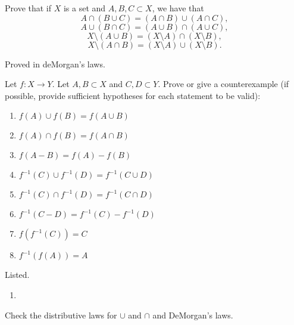   \begin{exercise}
    Prove that if $X$ is a set and $A,B,C \subset X$, we have that
    \begin{equation}
      A \cap (B \cup C) = (A \cap B) \cup (A \cap C),
    \end{equation}
    \begin{equation}
      A \cup (B \cap C) = (A \cup B) \cap (A \cup C),
    \end{equation}
    \begin{equation}
      X \setminus (A \cup B) = (X \setminus A) \cap (X \setminus B),
    \end{equation}
    \begin{equation}
      X \setminus (A \cap B) = (X \setminus A) \cup (X \setminus B).
    \end{equation}
  \end{exercise}
  \begin{solution}
    Proved in deMorgan's laws. 
  \end{solution}

  \begin{exercise}
    Let $f: X \to Y$. Let $A,B \subset X$ and $C,D \subset Y$. Prove or give a counterexample (if possible, provide sufficient hypotheses for each statement to be valid):
    \begin{enumerate}
      \item $f(A) \cup f(B) = f(A \cup B)$
      \item $f(A) \cap f(B) = f(A \cap B)$
      \item $f(A - B) = f(A) - f(B)$
      \item $f^{-1}(C) \cup f^{-1}(D) = f^{-1}(C \cup D)$
      \item $f^{-1}(C) \cap f^{-1}(D) = f^{-1}(C \cap D)$
      \item $f^{-1}(C - D) = f^{-1}(C) - f^{-1}(D)$
      \item $f(f^{-1}(C)) = C$
      \item $f^{-1}(f(A)) = A$
    \end{enumerate} 
  \end{exercise}
  \begin{solution}
    Listed. 
    \begin{enumerate}
      \item 
    \end{enumerate}
  \end{solution}

  \begin{exercise}[Munkres 1.1]
    Check the distributive laws for $\cup$ and $\cap$ and DeMorgan's laws.
  \end{exercise}
  \begin{solution}
    
  \end{solution}

